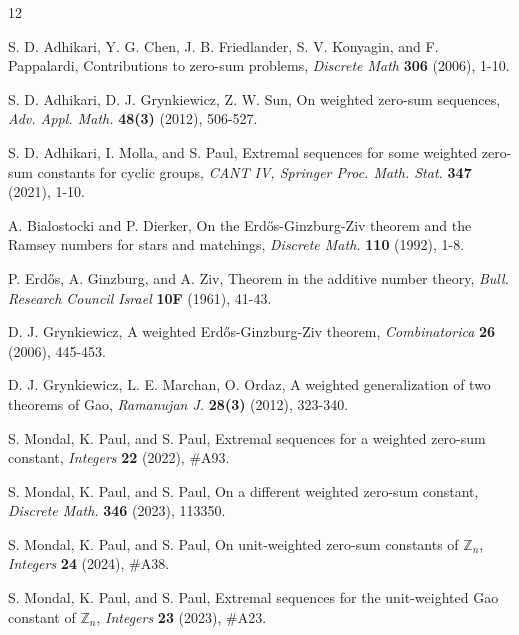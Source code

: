 \documentclass{article}[11pt]
\theoremstyle{definition}
\begin{document}
\begin{thebibliography}{12}

S. D. Adhikari, Y. G. Chen, J. B. Friedlander, S. V. Konyagin, and F. Pappalardi, Contributions to zero-sum problems, {\em Discrete Math} {\bf 306} (2006), 1-10.

S. D. Adhikari, D. J. Grynkiewicz, Z. W. Sun, On weighted zero-sum sequences, {\em Adv. Appl. Math.} {\bf 48(3)} (2012), 506-527.

S. D. Adhikari, I. Molla, and S. Paul, Extremal sequences for some weighted zero-sum constants for cyclic groups,  {\em CANT IV, Springer Proc. Math. Stat.} {\bf 347} (2021), 1-10.

A. Bialostocki and P. Dierker, On the Erd\H{o}s-Ginzburg-Ziv theorem and the Ramsey numbers
for stars and matchings, {\em Discrete Math.} {\bf 110} (1992), 1-8.

P. Erd\H{o}s, A. Ginzburg, and A. Ziv, Theorem in the
additive number theory, {\em Bull. Research Council Israel} {\bf 10F} (1961), 41-43.

D. J. Grynkiewicz, A weighted Erd\H{o}s-Ginzburg-Ziv theorem, {\em Combinatorica} {\bf 26} (2006), 445-453.

D. J. Grynkiewicz, L. E. Marchan, O. Ordaz, A weighted generalization of two theorems of Gao, {\em Ramanujan J.} {\bf 28(3)} (2012), 323-340.

S. Mondal, K. Paul, and S. Paul, Extremal sequences for a weighted zero-sum constant, {\em Integers} {\bf 22} (2022), \#A93.

S. Mondal, K. Paul, and S. Paul, On a different weighted zero-sum constant, {\em Discrete Math.} {\bf 346} (2023), 113350.

S. Mondal, K. Paul, and S. Paul, On unit-weighted zero-sum constants of $\mathbb Z_n$, {\em Integers} {\bf 24} (2024), \#A38.

S. Mondal, K. Paul, and S. Paul, Extremal sequences for the unit-weighted Gao constant of $\mathbb Z_n$, {\em Integers} {\bf 23} (2023), \#A23.
\end{thebibliography}
\end{document}
